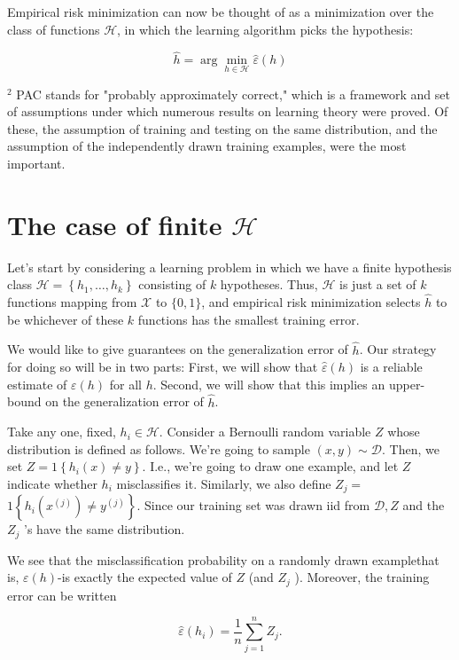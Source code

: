 \documentclass[10pt]{article}
\begin{document}
Empirical risk minimization can now be thought of as a minimization over the class of functions \(\mathcal{H}\), in which the learning algorithm picks the hypothesis:

\[
\hat{h}=\arg \min _{h \in \mathcal{H}} \hat{\varepsilon}(h)
\]

\({ }^{2}\) PAC stands for "probably approximately correct," which is a framework and set of assumptions under which numerous results on learning theory were proved. Of these, the assumption of training and testing on the same distribution, and the assumption of the independently drawn training examples, were the most important.

\section{The case of finite \(\mathcal{H}\)}
Let's start by considering a learning problem in which we have a finite hypothesis class \(\mathcal{H}=\left\{h_{1}, \ldots, h_{k}\right\}\) consisting of \(k\) hypotheses. Thus, \(\mathcal{H}\) is just a set of \(k\) functions mapping from \(\mathcal{X}\) to \(\{0,1\}\), and empirical risk minimization selects \(\hat{h}\) to be whichever of these \(k\) functions has the smallest training error.

We would like to give guarantees on the generalization error of \(\hat{h}\). Our strategy for doing so will be in two parts: First, we will show that \(\hat{\varepsilon}(h)\) is a reliable estimate of \(\varepsilon(h)\) for all \(h\). Second, we will show that this implies an upper-bound on the generalization error of \(\hat{h}\).

Take any one, fixed, \(h_{i} \in \mathcal{H}\). Consider a Bernoulli random variable \(Z\) whose distribution is defined as follows. We're going to sample \((x, y) \sim \mathcal{D}\). Then, we set \(Z=1\left\{h_{i}(x) \neq y\right\}\). I.e., we're going to draw one example, and let \(Z\) indicate whether \(h_{i}\) misclassifies it. Similarly, we also define \(Z_{j}=\) \(1\left\{h_{i}\left(x^{(j)}\right) \neq y^{(j)}\right\}\). Since our training set was drawn iid from \(\mathcal{D}, Z\) and the \(Z_{j}\) 's have the same distribution.

We see that the misclassification probability on a randomly drawn examplethat is, \(\varepsilon(h)\)-is exactly the expected value of \(Z\) (and \(Z_{j}\) ). Moreover, the training error can be written

\[
\hat{\varepsilon}\left(h_{i}\right)=\frac{1}{n} \sum_{j=1}^{n} Z_{j} .
\]
\end{document}
